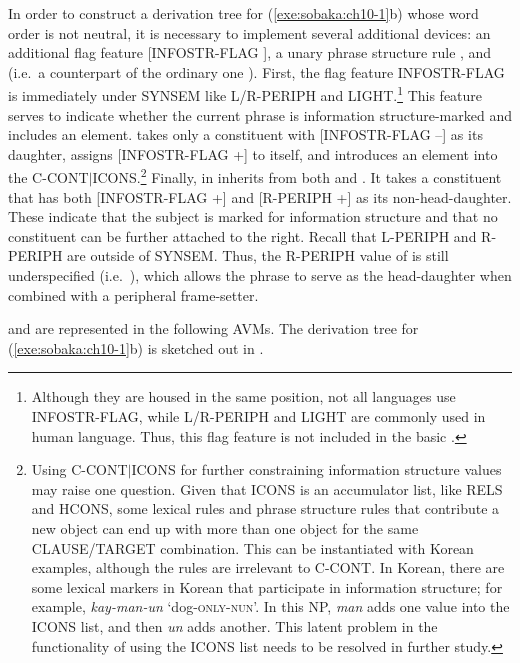 In order to construct a derivation tree for (\ref{exe:sobaka:ch10-1}b)
whose word order is not neutral, it is necessary to implement several
additional devices: an additional flag feature [INFOSTR-FLAG
  ], a unary phrase structure rule
, and  (i.e.\ a
counterpart of the ordinary one
). First, the flag feature INFOSTR-FLAG is immediately under
SYNSEM like L/R-PERIPH and LIGHT.\footnote{Although they are housed in
  the same position, not all languages use INFOSTR-FLAG, while
  L/R-PERIPH and LIGHT are commonly used in human language. Thus, this
  flag feature is not included in the basic .} This
feature serves to indicate whether the current phrase is information
structure-marked and includes an 
element.  takes only a constituent with
[INFOSTR-FLAG --] as its daughter, assigns [INFOSTR-FLAG +] to itself,
and introduces an  element into the
C-CONT{$\mid$}ICONS.\footnote{Using C-CONT{$\mid$}ICONS for further
  constraining information structure values may raise one question.
  Given that ICONS is an accumulator list, like RELS and HCONS, some
  lexical rules and phrase structure rules that contribute a new
   object can end up with more than one 
  object for the same CLAUSE/TARGET combination. This can be
  instantiated with Korean examples, although the rules are irrelevant
  to C-CONT.  In Korean, there are some lexical markers in Korean that
  participate in information structure; for example,
  \textit{kay-man-un} `dog-\textsc{only}-\textsc{nun}'. In this NP,
  \textit{man} adds one value into the ICONS list, and then
  \textit{un} adds another. This latent problem in the functionality
  of using the ICONS list needs to be resolved in further study.}
Finally,  in  inherits from both
 and . It takes a
constituent that has both [INFOSTR-FLAG +] and [R-PERIPH +] as its
non-head-daughter.  These indicate that the subject is marked for
information structure and that no constituent can be further attached
to the right. Recall that L-PERIPH and R-PERIPH are outside of
SYNSEM. Thus, the R-PERIPH value of  is still
underspecified (i.e.\ ), which allows the phrase to serve as
the head-daughter when combined with a peripheral frame-setter.


 and  are represented
in the following AVMs.  The derivation tree for
(\ref{exe:sobaka:ch10-1}b) is sketched out in .


